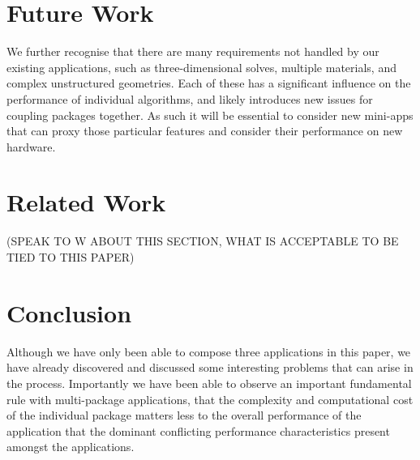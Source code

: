\documentclass[runningheads,a4paper]{llncs}
\begin{document}
\section{Future Work}

We further recognise that there are many requirements not handled by our existing applications, such as three-dimensional solves, multiple materials, and complex unstructured geometries. Each of these has a significant influence on the performance of individual algorithms, and likely introduces new issues for coupling packages together. As such it will be essential to consider new mini-apps that can proxy those particular features and consider their performance on new hardware.

\section{Related Work}

(SPEAK TO W ABOUT THIS SECTION, WHAT IS ACCEPTABLE TO BE TIED TO THIS PAPER)

\section{Conclusion}

Although we have only been able to compose three applications in this paper, we have already discovered and discussed some interesting problems that can arise in the process. Importantly we have been able to observe an important fundamental rule with multi-package applications, that the complexity and computational cost of the individual package matters less to the overall performance of the application that the dominant conflicting performance characteristics present amongst the applications.



\end{document}
